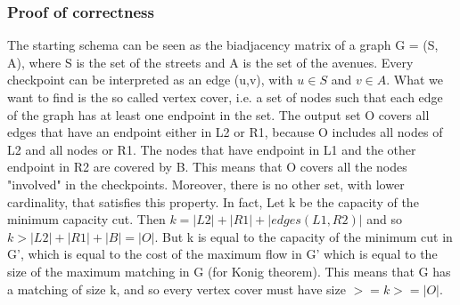 \subsubsection{Proof of correctness}
The starting schema can be seen as the biadjacency matrix of a graph G = (S, A), where S is the set of the streets and A is the set of the avenues. Every checkpoint can be interpreted as an edge (u,v), with $u \in S$ and $v \in A$. What we want to find is the so called vertex cover, i.e. a set of nodes such that each edge of the graph has at least one endpoint in the set.
The output set O covers all edges that have an endpoint either in L2 or R1, because O includes all nodes of L2 and all nodes or R1. The nodes that have endpoint in L1 and the other endpoint in R2 are covered by B. This means that O covers all the nodes "involved" in the checkpoints. Moreover, there is no other set, with lower cardinality, that satisfies this property. In fact, Let k be the capacity of the minimum capacity cut. Then $k = |L2| + |R1| + |edges(L1,R2)|$ and so $k > |L2| + |R1| + |B| = |O|$. But k is equal to the capacity of the minimum cut in G', which is equal to the cost of the maximum flow in G' which is equal to the size of the maximum matching in G (for Konig theorem). This means that G has a matching of size k, and so every vertex cover must have size $>= k >= |O|$.
